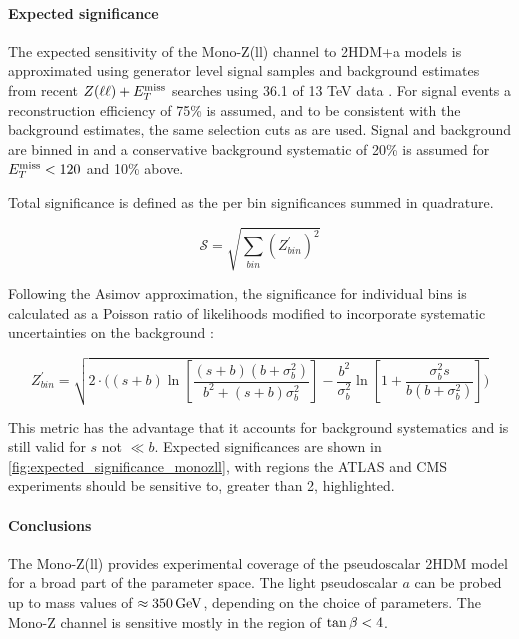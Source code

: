 \paragraph{Expected significance}

The expected sensitivity of the Mono-Z(ll) channel to 2HDM+a models is approximated using generator level signal samples and background estimates from recent $Z(\ell \ell) + E_T^\mathrm{miss}$ searches using 36.1 \ifb of 13 TeV data \cite{Aaboud:2017bja}.  For signal events a reconstruction efficiency of 75\% is assumed, and to be consistent with the background estimates, the same selection cuts as \cite{Aaboud:2017bja} are used.  Signal and background are binned in \MET and a conservative background systematic of 20\% is assumed for $E_T^\mathrm{miss} < 120$ \GeV and 10\% above.

Total significance is defined as the per bin significances summed in quadrature.

\begin{equation}
\mathcal{S} = \sqrt{\sum_{bin} (Z^\prime_{bin})^2}
\end{equation}

Following the Asimov approximation, the significance for individual bins is calculated as a Poisson ratio of likelihoods modified to incorporate  systematic uncertainties on the background  \cite{Cowan:2012}:  

\begin{equation}
\label{eq:significance_wsyst}
Z^\prime_{bin} = \sqrt{ 2 \cdot \bigg( (s+b) \ln[\frac{ (s+b) (b+\sigma_b^2) } {b^2 + (s+b) \sigma_b^2} ]- \frac{b^2}{\sigma_b^2} \ln[1 + \frac{\sigma_b^2 s}{b(b+\sigma_b^2)} ] \bigg) }
\end{equation}

This metric has the advantage that it accounts for background systematics and is still valid for $s$ not $\ll b$.  Expected significances are shown in  \autoref{fig:expected_significance_monozll}, with regions the ATLAS and CMS experiments should be sensitive to, greater than 2, highlighted.



\paragraph{Conclusions} The Mono-Z(ll) provides experimental coverage of the pseudoscalar 2HDM model for a broad part of the parameter space. The light pseudoscalar $a$ can be probed up to mass values of $\approx\unit[350]{GeV}$, depending on the choice of parameters. The Mono-Z channel is sensitive mostly in the region of $\tan\beta<4$.











